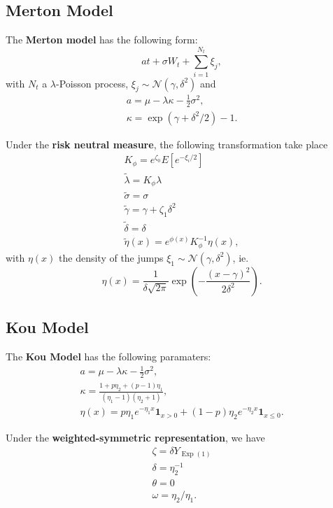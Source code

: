 \documentclass[10pt]{article}
\newcommand{\normal}{\mathscr{N}}
\DeclareMathOperator{\Exp}{Exp}
\begin{document}
\subsection{Merton Model}
\begin{outline}
  \1 The \textbf{Merton model} has the following form:
  \begin{equation*}
    at + \sigma W_t + \sum_{i=1}^{N_t} \xi_j,
  \end{equation*}
  with $N_t$ a $\lambda$-Poisson process, $\xi_j \sim \normal(\gamma,\delta^2)$ and
  \begin{gather*}
    a = \mu -\lambda\kappa - \tfrac{1}{2}\sigma^2,\\
    \kappa=  \exp(\gamma+\delta^2/2) - 1.
  \end{gather*}

  \1 Under the \textbf{risk neutral measure}, the following transformation take place 
  \begin{gather*}
    K_\phi = e^{\zeta_0}E[e^{-\xi_i/2}]\\
    \tilde\lambda = K_\phi\lambda\\
    \tilde\sigma = \sigma\\
    \tilde\gamma = \gamma + \zeta_1\delta^2\\
    \tilde\delta = \delta\\
    \tilde\eta(x) = e^{\phi(x)}K_\phi^{-1}\eta(x),
  \end{gather*}
  with $\eta(x)$ the density of the jumps $\xi_1\sim\normal(\gamma,\delta^2)$, ie.
  \begin{equation*}
    \eta(x) = \frac{1}{\delta\sqrt{2\pi}}\exp\left(-\frac{(x-\gamma)^2}{2\delta^2}\right).
  \end{equation*}
\end{outline}

\subsection{Kou Model}

\begin{outline}
  \1 The \textbf{Kou Model} has the following paramaters:
  \begin{gather*}
    a = \mu - \lambda\kappa - \tfrac{1}{2}\sigma^2,\\
    \kappa = \frac{1+p\eta_2+(p-1)\eta_1}{(\eta_1-1)(\eta_2+1)},\\
    \eta(x) = p\eta_1 e^{-\eta_1 x} \bm 1_{x>0} + (1-p)\eta_2 e^{-\eta_2x}\bm 1_{x\leq 0}.
  \end{gather*}

  \1 Under the \textbf{weighted-symmetric representation}, we have
  \begin{gather*}
    \zeta = \delta Y_{\Exp(1)}\\
    \delta = \eta_2^{-1}\\
    \theta = 0\\
    \omega = \eta_2/\eta_1.
  \end{gather*}
\end{outline}
\end{document}
